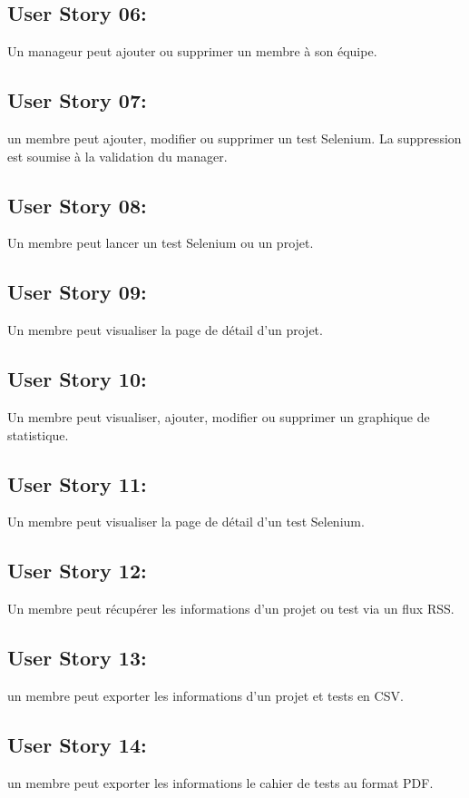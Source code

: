 	\subsection{User Story 06:}
	Un manageur peut ajouter ou supprimer un membre à son équipe.
	
	\subsection{User Story 07:}
	un membre peut ajouter, modifier ou supprimer un test Selenium. La suppression est soumise à la validation
	du manager.
	
	\subsection{User Story 08:}
	Un membre peut lancer un test Selenium ou un projet.
	
	
	\subsection{User Story 09:}
	Un membre peut visualiser la page de détail d'un projet.
	
	\subsection{User Story 10:}
	Un membre peut  visualiser, ajouter, modifier ou supprimer un graphique de statistique.
	
	\subsection{User Story 11:}
	Un membre peut visualiser la page de détail d'un test Selenium.
	
	\subsection{User Story 12:}
	Un membre peut récupérer les informations d'un projet ou test via un flux RSS.

	\subsection{User Story 13:}
	un membre peut exporter les informations d'un projet et tests en CSV.
	
	\subsection{User Story 14:}
	un membre peut exporter les informations le cahier de tests au format PDF.
		
